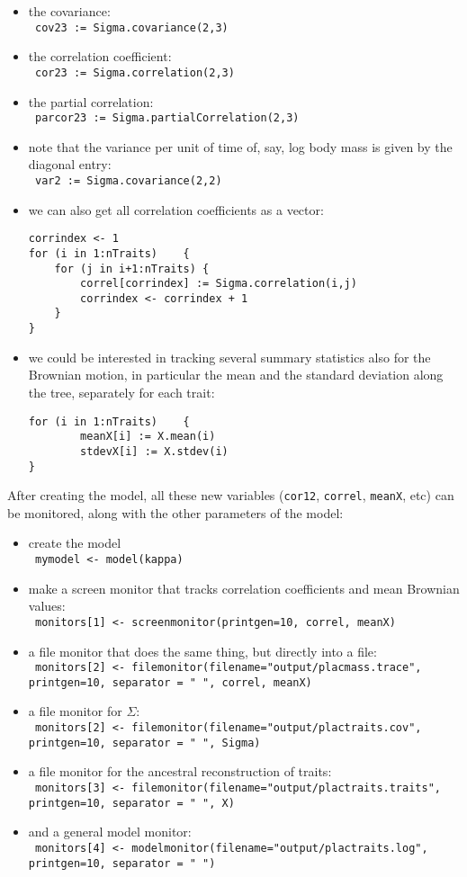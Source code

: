 \documentclass[usletter]{article}
\newcommand{\cmd}[1]{\texttt{#1}}
\begin{document}
\begin{itemize}
\item
the covariance:
\\
\cmd{
cov23 := Sigma.covariance(2,3)
}
\item
the correlation coefficient:
\\
\cmd{
cor23 := Sigma.correlation(2,3)
}
\item
the partial correlation:
\\
\cmd{
parcor23 := Sigma.partialCorrelation(2,3)
}
\item
note that the variance per unit of time of, say, log body mass is given by the diagonal entry:
\\
\cmd{
var2 := Sigma.covariance(2,2)
}
\item
we can also get all correlation coefficients as a vector:
\begin{verbatim}
corrindex <- 1
for (i in 1:nTraits)    {
    for (j in i+1:nTraits) {
        correl[corrindex] := Sigma.correlation(i,j)
        corrindex <- corrindex + 1
    }
}
\end{verbatim}
\item
we could be interested in tracking several summary statistics also for the Brownian motion, in particular the mean and the standard deviation along the tree, separately for each trait:
\begin{verbatim}
for (i in 1:nTraits)    {
        meanX[i] := X.mean(i)
        stdevX[i] := X.stdev(i)
}
\end{verbatim}
\end{itemize}
After creating the model, all these new variables (\cmd{cor12}, \cmd{correl}, \cmd{meanX}, etc) can be monitored, along with the other parameters of the model:
\begin{itemize}
\item
create the model
\\
\cmd{
mymodel <- model(kappa)
}
\item
make a screen monitor that tracks correlation coefficients and mean Brownian values:
\\
\cmd{
monitors[1] <- screenmonitor(printgen=10, correl, meanX)
}
\item
a file monitor that does the same thing, but directly into a file:
\\
\cmd{
monitors[2] <- filemonitor(filename="output/placmass.trace", printgen=10, separator = "       ", correl, meanX)
}
\item
a file monitor for $\Sigma$:
\\
\cmd{
monitors[2] <- filemonitor(filename="output/plactraits.cov", printgen=10, separator = "  ", Sigma)
}
\item
a file monitor for the ancestral reconstruction of traits:
\\
\cmd{
monitors[3] <- filemonitor(filename="output/plactraits.traits", printgen=10, separator = "       ", X)
}
\item
and a general model monitor:
\\
\cmd{
monitors[4] <- modelmonitor(filename="output/plactraits.log", printgen=10, separator = " ")
}
\end{itemize}
\end{document}
